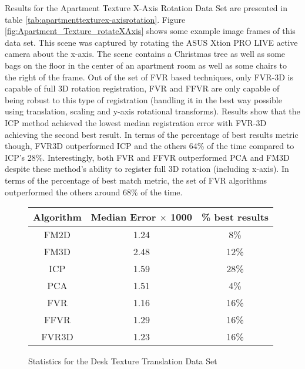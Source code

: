 Results for the Apartment Texture X-Axis Rotation Data Set are presented in table \ref{tab:apartmenttexturex-axisrotation}. Figure \ref{fig:Apartment_Texture_rotateXAxis} shows some example image frames of this data set. This scene was captured by rotating the ASUS Xtion PRO LIVE active camera about the x-axis. The scene contains a Christmas tree as well as some bags on the floor in the center of an apartment room as well as some chairs to the right of the frame. Out of the set of FVR based techniques, only FVR-3D is capable of full 3D rotation registration, FVR and FFVR are only capable of being robust to this type of registration (handling it in the best way possible using translation, scaling and y-axis rotational transforms). Results show that the ICP method achieved the lowest median registration error with FVR-3D achieving the second best result. In terms of the percentage of best results metric though, FVR3D outperformed ICP and the others 64\% of the time compared to ICP's 28\%. Interestingly, both FVR and FFVR outperformed PCA and FM3D despite these method's ability to register full 3D rotation (including x-axis). In terms of the percentage of best match metric, the set of FVR algorithms outperformed the others around 68\% of the time. \\

\begin{figure}
\centering
\begin{tabular}{ccc}
\hline
\textbf{Algorithm} & \textbf{Median Error $\times$ 1000} & \textbf{\% best results}\\ \hline
FM2D	& 1.24 & 8\%\\
FM3D	& 2.48 & 12\%\\
ICP	& 1.59 & 28\%\\
PCA	& 1.51 & 4\%\\
FVR	& 1.16 & 16\%\\
FFVR	& 1.29 & 16\%\\
FVR3D	& 1.23 & 16\%\\
\end{tabular}
\caption{Statistics for the Desk Texture Translation Data Set}
\label{tab:desktexturetranslation}
\end{figure} 

